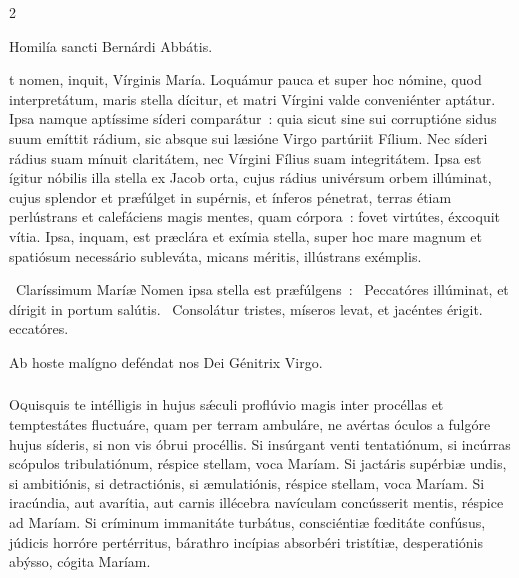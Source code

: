 \documentclass[9pt,twoside]{extarticle}
\begin{document}
\begin{multicols}{2}
\begin{center}Homilía sancti Bernárdi Abbátis.\\
\end{center}
t nomen, inquit, Vírginis María. Loquámur pauca et super hoc nómine, quod interpretátum, maris stella dícitur, et matri Vírgini valde conveniénter aptátur. Ipsa namque aptíssime síderi comparátur~: quia sicut sine sui corruptióne sidus suum emíttit rádium, sic absque sui læsióne Virgo partúriit Fílium. Nec síderi rádius suam mínuit claritátem, nec Vírgini Fílius suam integritátem. Ipsa est ígitur nóbilis illa stella ex Jacob orta, cujus rádius univérsum orbem illúminat, cujus splendor et præfúlget in supérnis, et ínferos pénetrat, terras étiam perlústrans et calefáciens magis mentes, quam córpora~: fovet virtútes, éxcoquit vítia. Ipsa, inquam, est præclára et exímia stella, super hoc mare magnum et spatiósum necessário subleváta, micans méritis, illústrans exémplis.

\begin{tightlist}{}
\item {}~Claríssimum Maríæ Nomen ipsa stella est præfúlgens~: \textred{*}~Peccatóres illúminat, et dírigit in portum salútis. ~Consolátur tristes, míseros levat, et jacéntes érigit. eccatóres.
\item {\small {} Ab hoste malígno deféndat nos Dei Génitrix Virgo.}
\end{tightlist}

\subsubsection*{\center {}}
\lettrine{O} quisquis te intélligis in hujus sǽculi proflúvio magis inter procéllas et temptestátes fluctuáre, quam per terram ambuláre, ne avértas óculos a fulgóre hujus síderis, si non vis óbrui procéllis. Si insúrgant venti tentatiónum, si incúrras scópulos tribulatiónum, réspice stellam, voca Maríam. Si jactáris supérbiæ undis, si ambitiónis, si detractiónis, si æmulatiónis, réspice stellam, voca Maríam. Si iracúndia, aut avarítia, aut carnis illécebra navículam concússerit mentis, réspice ad Maríam. Si críminum immanitáte turbátus, consciéntiæ fœditáte confúsus, júdicis horróre pertérritus, bárathro incípias absorbéri tristítiæ, desperatiónis abýsso, cógita Maríam.


\end{multicols}
\end{document}
